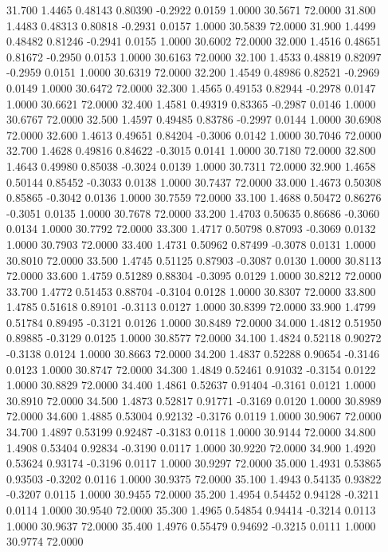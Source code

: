   31.700   1.4465   0.48143   0.80390  -0.2922   0.0159   1.0000  30.5671  72.0000
  31.800   1.4483   0.48313   0.80818  -0.2931   0.0157   1.0000  30.5839  72.0000
  31.900   1.4499   0.48482   0.81246  -0.2941   0.0155   1.0000  30.6002  72.0000
  32.000   1.4516   0.48651   0.81672  -0.2950   0.0153   1.0000  30.6163  72.0000
  32.100   1.4533   0.48819   0.82097  -0.2959   0.0151   1.0000  30.6319  72.0000
  32.200   1.4549   0.48986   0.82521  -0.2969   0.0149   1.0000  30.6472  72.0000
  32.300   1.4565   0.49153   0.82944  -0.2978   0.0147   1.0000  30.6621  72.0000
  32.400   1.4581   0.49319   0.83365  -0.2987   0.0146   1.0000  30.6767  72.0000
  32.500   1.4597   0.49485   0.83786  -0.2997   0.0144   1.0000  30.6908  72.0000
  32.600   1.4613   0.49651   0.84204  -0.3006   0.0142   1.0000  30.7046  72.0000
  32.700   1.4628   0.49816   0.84622  -0.3015   0.0141   1.0000  30.7180  72.0000
  32.800   1.4643   0.49980   0.85038  -0.3024   0.0139   1.0000  30.7311  72.0000
  32.900   1.4658   0.50144   0.85452  -0.3033   0.0138   1.0000  30.7437  72.0000
  33.000   1.4673   0.50308   0.85865  -0.3042   0.0136   1.0000  30.7559  72.0000
  33.100   1.4688   0.50472   0.86276  -0.3051   0.0135   1.0000  30.7678  72.0000
  33.200   1.4703   0.50635   0.86686  -0.3060   0.0134   1.0000  30.7792  72.0000
  33.300   1.4717   0.50798   0.87093  -0.3069   0.0132   1.0000  30.7903  72.0000
  33.400   1.4731   0.50962   0.87499  -0.3078   0.0131   1.0000  30.8010  72.0000
  33.500   1.4745   0.51125   0.87903  -0.3087   0.0130   1.0000  30.8113  72.0000
  33.600   1.4759   0.51289   0.88304  -0.3095   0.0129   1.0000  30.8212  72.0000
  33.700   1.4772   0.51453   0.88704  -0.3104   0.0128   1.0000  30.8307  72.0000
  33.800   1.4785   0.51618   0.89101  -0.3113   0.0127   1.0000  30.8399  72.0000
  33.900   1.4799   0.51784   0.89495  -0.3121   0.0126   1.0000  30.8489  72.0000
  34.000   1.4812   0.51950   0.89885  -0.3129   0.0125   1.0000  30.8577  72.0000
  34.100   1.4824   0.52118   0.90272  -0.3138   0.0124   1.0000  30.8663  72.0000
  34.200   1.4837   0.52288   0.90654  -0.3146   0.0123   1.0000  30.8747  72.0000
  34.300   1.4849   0.52461   0.91032  -0.3154   0.0122   1.0000  30.8829  72.0000
  34.400   1.4861   0.52637   0.91404  -0.3161   0.0121   1.0000  30.8910  72.0000
  34.500   1.4873   0.52817   0.91771  -0.3169   0.0120   1.0000  30.8989  72.0000
  34.600   1.4885   0.53004   0.92132  -0.3176   0.0119   1.0000  30.9067  72.0000
  34.700   1.4897   0.53199   0.92487  -0.3183   0.0118   1.0000  30.9144  72.0000
  34.800   1.4908   0.53404   0.92834  -0.3190   0.0117   1.0000  30.9220  72.0000
  34.900   1.4920   0.53624   0.93174  -0.3196   0.0117   1.0000  30.9297  72.0000
  35.000   1.4931   0.53865   0.93503  -0.3202   0.0116   1.0000  30.9375  72.0000
  35.100   1.4943   0.54135   0.93822  -0.3207   0.0115   1.0000  30.9455  72.0000
  35.200   1.4954   0.54452   0.94128  -0.3211   0.0114   1.0000  30.9540  72.0000
  35.300   1.4965   0.54854   0.94414  -0.3214   0.0113   1.0000  30.9637  72.0000
  35.400   1.4976   0.55479   0.94692  -0.3215   0.0111   1.0000  30.9774  72.0000
